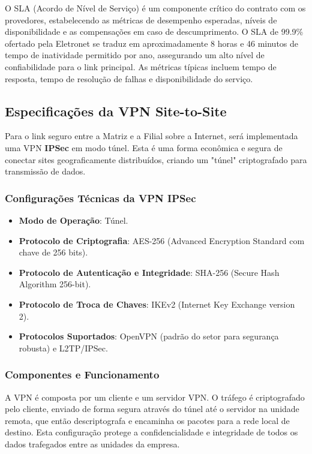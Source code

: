 \documentclass[a4paper, 12pt]{article}
\begin{document}
O SLA (Acordo de Nível de Serviço) é um componente crítico do contrato com os provedores, estabelecendo as métricas de desempenho esperadas, níveis de disponibilidade e as compensações em caso de descumprimento. O SLA de 99.9\% ofertado pela Eletronet se traduz em aproximadamente 8 horas e 46 minutos de tempo de inatividade permitido por ano, assegurando um alto nível de confiabilidade para o link principal. As métricas típicas incluem tempo de resposta, tempo de resolução de falhas e disponibilidade do serviço.

\subsection{Especificações da VPN Site-to-Site}
\label{subsec:vpn}

Para o link seguro entre a Matriz e a Filial sobre a Internet, será implementada uma VPN \textbf{IPSec} em modo túnel. Esta é uma forma econômica e segura de conectar sites geograficamente distribuídos, criando um "túnel" criptografado para transmissão de dados.

\subsubsection{Configurações Técnicas da VPN IPSec}
\label{subsubsec:vpn-config}

\begin{itemize}
    \item \textbf{Modo de Operação}: Túnel.
    \item \textbf{Protocolo de Criptografia}: AES-256 (Advanced Encryption Standard com chave de 256 bits).
    \item \textbf{Protocolo de Autenticação e Integridade}: SHA-256 (Secure Hash Algorithm 256-bit).
    \item \textbf{Protocolo de Troca de Chaves}: IKEv2 (Internet Key Exchange version 2).
    \item \textbf{Protocolos Suportados}: OpenVPN (padrão do setor para segurança robusta) e L2TP/IPSec.
\end{itemize}

\subsubsection{Componentes e Funcionamento}
\label{subsubsec:vpn-components}

A VPN é composta por um cliente e um servidor VPN. O tráfego é criptografado pelo cliente, enviado de forma segura através do túnel até o servidor na unidade remota, que então descriptografa e encaminha os pacotes para a rede local de destino. Esta configuração protege a confidencialidade e integridade de todos os dados trafegados entre as unidades da empresa.
\end{document}
